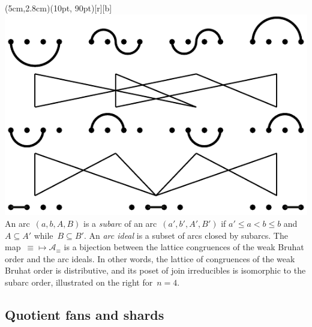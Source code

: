 \documentclass{amsart}
\theoremstyle{definition}
\renewcommand{\c}[1]{\mathcal{#1}} %
\newcommand{\darkblue}{\color{darkblue}} %
\newcommand{\defn}[1]{\textsl{\darkblue #1}} %
\begin{document}
\vspace{-.2cm}
\parpic(5cm,2.8cm)(10pt, 90pt)[r][b]{\includegraphics[scale=.5]{subarcOrder}}{
An arc~$(a, b, A, B)$ is a \defn{subarc} of an arc~$(a', b', A', B')$ if \linebreak $a' \le a < b \le b$ and~$A \subseteq A'$ while~$B \subseteq B'$.
An \defn{arc ideal} is a subset of arcs closed by subarcs.
The map~${\equiv} \mapsto \c{A}_\equiv$ is a bijection between the lattice congruences of the weak Bruhat order and the arc ideals.
In other words, the lattice of congruences of the weak Bruhat order is distributive, and its poset of join irreducibles is isomorphic to the subarc order, illustrated on the right for~$n = 4$.
}


\subsection{Quotient fans and shards}
\label{subsec:quotientFans}
\end{document}
